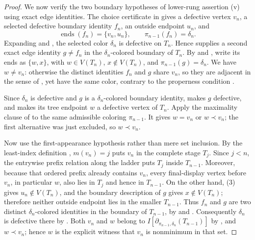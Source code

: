 \begin{proof}
We now verify the two boundary hypotheses of lower-rung assertion (v) using
exact edge identities.  The choice certificate in
 gives a defective vertex \(v_n\), a
selected defective boundary identity \(f_n\), an outside endpoint \(u_n\),
and
\[
 \operatorname{ends}(f_n)=\{v_n,u_n\},\qquad
 \pi_{n-1}(f_n)=\delta_n.                                      \tag{3}
\]
Expanding  and
, the selected color \(\delta_n\) is defective
on \(T_n\).  Hence  supplies a second exact edge
identity \(g\ne f_n\) in the \(\delta_n\)-colored boundary of \(T_n\).
By  and , write its
ends as \(\{w,x\}\), with \(w\in V(T_n)\), \(x\notin V(T_n)\), and
\(\pi_{n-1}(g)=\delta_n\).  We have \(w\ne v_n\): otherwise the distinct
identities \(f_n\) and \(g\) share \(v_n\), so they are adjacent in the
sense of , yet have the same color, contrary to the
properness condition .

Since \(\delta_n\) is defective and \(g\) is a
\(\delta_n\)-colored boundary identity,  makes
\(g\) defective, and  makes its tree endpoint
\(w\) a defective vertex of \(T_n\).  Apply the maximality clause of
 to the same admissible coloring
\(\pi_{n-1}\).  It gives \(w=v_n\) or \(w\prec v_n\); the first alternative
was just excluded, so \(w\prec v_n\).

Now use the first-appearance hypothesis rather than mere set inclusion.
By the least-index definition ,
\(m(v_n)=j\) puts \(v_n\) in the complete stage \(T_j\).  Since \(j<n\),
the entrywise prefix relation  along
the ladder puts \(T_j\) inside \(T_{n-1}\).  Moreover, because that ordered
prefix already contains \(v_n\), every final-display vertex before
\(v_n\), in particular \(w\), also lies in \(T_j\) and hence in
\(T_{n-1}\).  On the other hand, (3) gives
\(u_n\notin V(T_n)\), and the boundary description of \(g\) gives
\(x\notin V(T_n)\); therefore neither outside endpoint lies in the smaller
\(T_{n-1}\).  Thus \(f_n\) and \(g\) are two distinct
\(\delta_n\)-colored identities in the boundary of \(T_{n-1}\), by
 and .  Consequently
\(\delta_n\) is defective there by .  Both
\(v_n\) and \(w\) belong to
\(I[\partial_{\pi_{n-1},\delta_n}(T_{n-1})]\) by
, and \(w\prec v_n\); hence \(w\) is the
explicit witness that \(v_n\) is nonminimum in that set.


\end{proof}

